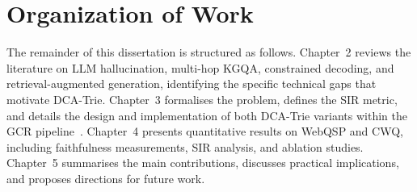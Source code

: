 \section{Organization of Work}

The remainder of this dissertation is structured as follows. Chapter~2 reviews the literature on LLM hallucination, multi-hop KGQA, constrained decoding, and retrieval-augmented generation, identifying the specific technical gaps that motivate DCA-Trie. Chapter~3 formalises the problem, defines the SIR metric, and details the design and implementation of both DCA-Trie variants within the GCR pipeline~\citep{luo2025-graph-constrained-reasoning}. Chapter~4 presents quantitative results on WebQSP and CWQ, including faithfulness measurements, SIR analysis, and ablation studies. Chapter~5 summarises the main contributions, discusses practical implications, and proposes directions for future work.
